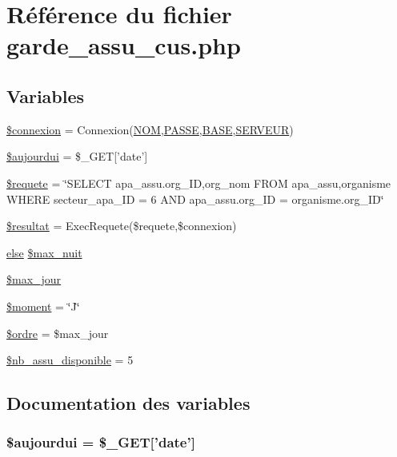 \hypertarget{garde__assu__cus_8php}{
\section{R\'{e}f\'{e}rence du fichier garde\_\-assu\_\-cus.php}
\label{garde__assu__cus_8php}
}
\subsection*{Variables}
\begin{CompactItemize}
\item 
\hyperlink{garde__assu__cus_8php_a0}{\$connexion} = Connexion(\hyperlink{pma__connect_8php_a0}{NOM},\hyperlink{pma__connect_8php_a1}{PASSE},\hyperlink{pma__connect_8php_a3}{BASE},\hyperlink{pma__connect_8php_a2}{SERVEUR})
\item 
\hyperlink{garde__assu__cus_8php_a1}{\$aujourdui} = \$\_\-GET\mbox{[}'date'\mbox{]}
\item 
\hyperlink{garde__assu__cus_8php_a2}{\$requete} = \char`\"{}SELECT apa\_\-assu.org\_\-ID,org\_\-nom FROM apa\_\-assu,organisme WHERE secteur\_\-apa\_\-ID = 6 AND apa\_\-assu.org\_\-ID = organisme.org\_\-ID\char`\"{}
\item 
\hyperlink{garde__assu__cus_8php_a3}{\$resultat} = Exec\-Requete(\$requete,\$connexion)
\item 
\hyperlink{cron_8php_a9}{else} \hyperlink{garde__assu__cus_8php_a4}{\$max\_\-nuit}
\item 
\hyperlink{garde__assu__cus_8php_a5}{\$max\_\-jour}
\item 
\hyperlink{garde__assu__cus_8php_a6}{\$moment} = \char`\"{}J\char`\"{}
\item 
\hyperlink{garde__assu__cus_8php_a7}{\$ordre} = \$max\_\-jour
\item 
\hyperlink{garde__assu__cus_8php_a8}{\$nb\_\-assu\_\-disponible} = 5
\end{CompactItemize}


\subsection{Documentation des variables}
\hypertarget{garde__assu__cus_8php_a1}{
\subsubsection[\$aujourdui]{\setlength{\rightskip}{0pt plus 5cm}\$aujourdui = \$\_\-GET\mbox{[}'date'\mbox{]}}}
\label{garde__assu__cus_8php_a1}


